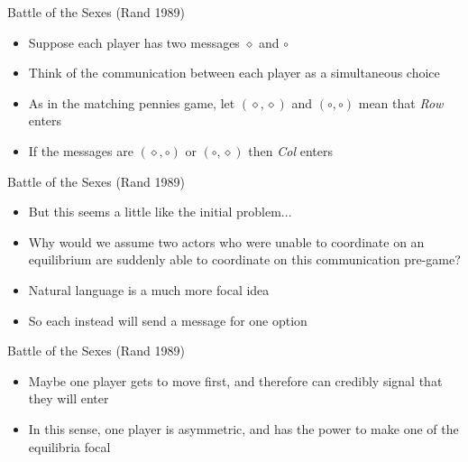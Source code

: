 \documentclass{beamer}
\begin{document}
\begin{frame}{Battle of the Sexes (Rand 1989)}
    \begin{card}
    	\begin{itemize}
    		\item Suppose each player has two messages $\diamond$ and $\circ$
    		\item Think of the communication between each player as a simultaneous choice
    		\item As in the matching pennies game, let $(\diamond,\diamond)$ and $(\circ,\circ)$  mean that \emph{Row} enters
    		\item If the messages are $(\diamond,\circ)$ or $(\circ,\diamond)$ then \emph{Col} enters
    	\end{itemize}
    \end{card}
\end{frame}

\begin{frame}{Battle of the Sexes (Rand 1989)}
\begin{card}
	\begin{itemize}
		\item But this seems a little like the initial problem...
		\item Why would we assume two actors who were unable to coordinate on an equilibrium are suddenly able to coordinate on this communication pre-game?
		\item Natural language is a much more focal idea 
		\item So each instead will send a message for one option
	\end{itemize}
\end{card}
\end{frame}

\begin{frame}{Battle of the Sexes (Rand 1989)}
\begin{card}
	\begin{itemize}
		\item Maybe one player gets to move first, and therefore can credibly signal that they will enter
		\item In this sense, one player is asymmetric, and has the power to make one of the equilibria focal
	\end{itemize}
\end{card}		
\end{frame}
\end{document}
